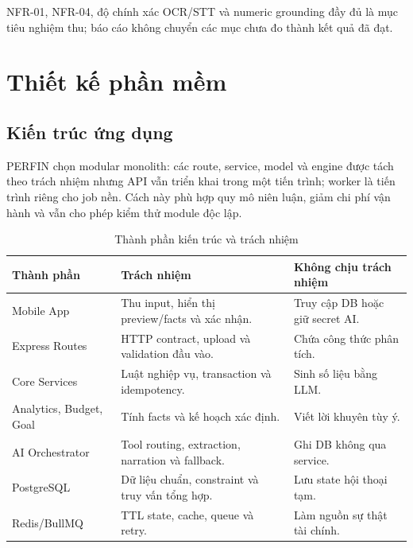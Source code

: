 NFR-01, NFR-04, độ chính xác OCR/STT và numeric grounding đầy đủ là mục tiêu nghiệm thu; báo cáo không chuyển các mục chưa đo thành kết quả đã đạt.

\section{Thiết kế phần mềm}

\subsection{Kiến trúc ứng dụng}

PERFIN chọn modular monolith: các route, service, model và engine được tách theo trách nhiệm nhưng API vẫn triển khai trong một tiến trình; worker là tiến trình riêng cho job nền. Cách này phù hợp quy mô niên luận, giảm chi phí vận hành và vẫn cho phép kiểm thử module độc lập.


\begin{table}[H]
  \centering
  \caption{Thành phần kiến trúc và trách nhiệm}
  \label{tab:components}
  \begin{tabularx}{\textwidth}{@{}L{3.2cm}Y Y@{}}
    \toprule
    \textbf{Thành phần} & \textbf{Trách nhiệm} & \textbf{Không chịu trách nhiệm} \\
    \midrule
    Mobile App & Thu input, hiển thị preview/facts và xác nhận. & Truy cập DB hoặc giữ secret AI. \\
    Express Routes & HTTP contract, upload và validation đầu vào. & Chứa công thức phân tích. \\
    Core Services & Luật nghiệp vụ, transaction và idempotency. & Sinh số liệu bằng LLM. \\
    Analytics, Budget, Goal & Tính facts và kế hoạch xác định. & Viết lời khuyên tùy ý. \\
    AI Orchestrator & Tool routing, extraction, narration và fallback. & Ghi DB không qua service. \\
    PostgreSQL & Dữ liệu chuẩn, constraint và truy vấn tổng hợp. & Lưu state hội thoại tạm. \\
    Redis/BullMQ & TTL state, cache, queue và retry. & Làm nguồn sự thật tài chính. \\
    \bottomrule
  \end{tabularx}
\end{table}

